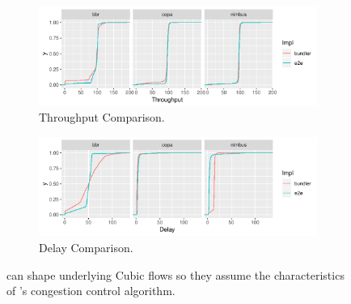 \begin{figure}
    \centering
    \begin{subfigure}[b]{0.5\textwidth}
\begin{knitrout}
\color{fgcolor}
\includegraphics[width=\maxwidth]{figure/cc_comparison_a-1} 

\end{knitrout}
    \caption{Throughput Comparison.}\label{fig:cc:comparison:a}
    \end{subfigure}
    \begin{subfigure}[b]{0.5\textwidth}
\begin{knitrout}
\color{fgcolor}
\includegraphics[width=\maxwidth]{figure/cc_comparison_b-1} 

\end{knitrout}
    \caption{Delay Comparison.}\label{fig:cc:comparison:b}
    \end{subfigure}

    \caption{\name can shape underlying Cubic flows so they assume the characteristics of \name's congestion control algorithm.}
    \label{fig:cc:comparison}
\end{figure}
